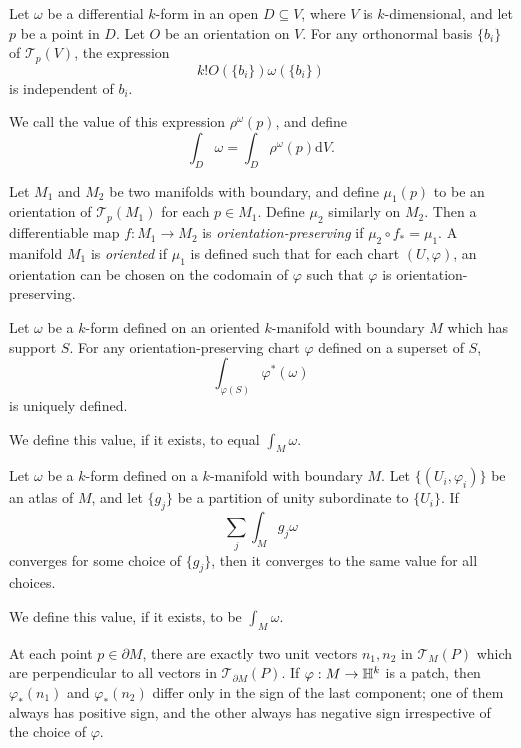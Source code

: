 \begin{prop}
    Let $\omega$ be a differential $k$-form in an open $D\subseteq V$, where $V$
    is $k$-dimensional, and let $p$ be a point in $D$. Let $O$ be an orientation
    on $V$. For any orthonormal basis $\{b_i\}$ of $\mathcal T_p(V)$, the expression
    \[k!O(\{b_i\})\omega(\{b_i\})\] is independent of $b_i$.
\end{prop}
\begin{defn}
    We call the value of this expression $\rho^\omega(p)$, and define
    \[\int_D \omega=\int_D\rho^\omega(p)\mathrm dV.\]
\end{defn}
\begin{defn}
    Let $M_1$ and $M_2$ be two manifolds with boundary, and define $\mu_1(p)$ to be an
    orientation of $\mathcal T_p(M_1)$ for each $p\in M_1$. Define $\mu_2$
    similarly on $M_2$. Then a differentiable map $f:M_1\to M_2$ is
    \emph{orientation-preserving} if $\mu_2\circ f_*=\mu_1$. A manifold $M_1$ is
    \emph{oriented} if $\mu_1$ is defined such that for each chart
    $(U,\varphi)$, an orientation can be chosen on the codomain of $\varphi$
    such that $\varphi$ is orientation-preserving.
\end{defn}
\begin{prop}
    Let $\omega$ be a $k$-form defined on an oriented $k$-manifold with boundary
    $M$ which has support $S$. For any orientation-preserving chart $\varphi$
    defined on a superset of $S$, \[\int_{\varphi(S)}\varphi^*(\omega)\]
    is uniquely defined.
\end{prop}
\begin{defn}
    We define this value, if it exists, to equal $\int_M\omega$.
\end{defn}
\begin{prop}
    Let $\omega$ be a $k$-form defined on a $k$-manifold with boundary $M$. Let
    $\{(U_i,\varphi_i)\}$ be an atlas of $M$, and let $\{g_j\}$ be a partition
    of unity subordinate to $\{U_i\}$. If
    \[\sum_j\int_M g_j\omega\]
    converges for some choice of $\{g_j\}$, then it converges to the same value
    for all choices.
\end{prop}
\begin{defn}
    We define this value, if it exists, to be $\int_M\omega$.
\end{defn}
\begin{prop}
    At each point $p\in\partial M$, there are exactly two unit vectors $n_1,n_2$
    in $\mathcal T_M(P)$ which are perpendicular to all vectors in
    $\mathcal T_{\partial M}(P)$. If $\varphi:M\to\mathbb{H}^k$ is a patch, then
    $\varphi_*(n_1)$ and $\varphi_*(n_2)$ differ only in the sign of the last
    component; one of them always has positive sign, and the other always has
    negative sign irrespective of the choice of $\varphi$.
\end{prop}

